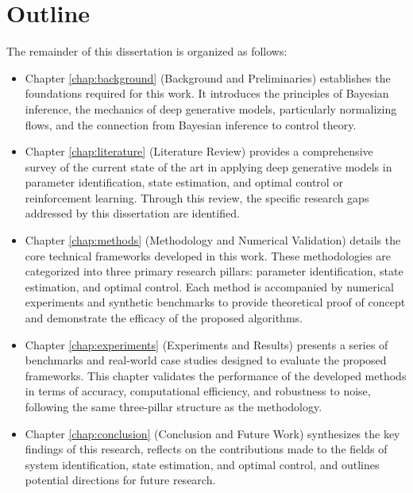 \section{Outline} 
\label{sec:introduction:outline}

The remainder of this dissertation is organized as follows:
\begin{itemize}
    \item Chapter \ref{chap:background} (Background and Preliminaries) establishes the foundations required for this work. It introduces the principles of Bayesian inference, the mechanics of deep generative models, particularly normalizing flows, and the connection from Bayesian inference to control theory. 
    \item Chapter \ref{chap:literature} (Literature Review) provides a comprehensive survey of the current state of the art in applying deep generative models in parameter identification, state estimation, and optimal control or reinforcement learning. Through this review, the specific research gaps addressed by this dissertation are identified.
    \item Chapter \ref{chap:methods} (Methodology and Numerical Validation) details the core technical frameworks developed in this work. These methodologies are categorized into three primary research pillars: parameter identification, state estimation, and optimal control. Each method is accompanied by numerical experiments and synthetic benchmarks to provide theoretical proof of concept and demonstrate the efficacy of the proposed algorithms.
    \item Chapter \ref{chap:experiments} (Experiments and Results) presents a series of benchmarks and real-world case studies designed to evaluate the proposed frameworks. This chapter validates the performance of the developed methods in terms of accuracy, computational efficiency, and robustness to noise, following the same three-pillar structure as the methodology.
    \item Chapter \ref{chap:conclusion} (Conclusion and Future Work) synthesizes the key findings of this research, reflects on the contributions made to the fields of system identification, state estimation, and optimal control, and outlines potential directions for future research.
\end{itemize}
